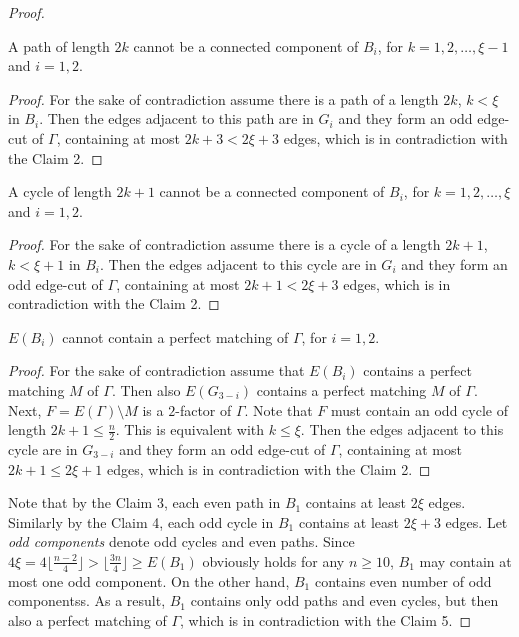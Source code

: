 \begin{proof}
    \begin{claim}
        A path of length $2k$ cannot be a connected component of $B_i$, for $k=1,2,\dots, \xi-1$ and $i = 1, 2$.
    \end{claim}
    \begin{proof}
        For the sake of contradiction assume there is a path of a length $2k$, $k<\xi$ in $B_i$. Then the edges adjacent to this path are in $G_i$ and they form an odd edge-cut of $\Gamma$, containing at most $2k+3<2\xi+3$ edges, which is in contradiction with the Claim 2.
    \end{proof}

    \begin{claim}
        A cycle of length $2k+1$ cannot be a connected component of $B_i$, for $k=1,2,\dots, \xi$ and $i = 1, 2$.
    \end{claim}
    \begin{proof}
        For the sake of contradiction assume there is a cycle of a length $2k+1$, $k<\xi+1$ in $B_i$. Then the edges adjacent to this cycle are in $G_i$ and they form an odd edge-cut of $\Gamma$, containing at most $2k+1<2\xi+3$ edges, which is in contradiction with the Claim 2.
    \end{proof}

    \begin{claim}
        $E(B_i)$ cannot contain a perfect matching of $\Gamma$, for $i = 1, 2$.
    \end{claim}
    \begin{proof}
        For the sake of contradiction assume that $E(B_i)$ contains a perfect matching $M$ of $\Gamma$. Then also $E(G_{3-i})$ contains a perfect matching $M$ of $\Gamma$. Next, $F=E(\Gamma)\setminus M$ is a $2$-factor of $\Gamma$. Note that $F$ must contain an odd cycle of length $2k+1\leq\frac n2$. This is equivalent with $k\leq\xi$. Then the edges adjacent to this cycle are in $G_{3-i}$ and they form an odd edge-cut of $\Gamma$, containing at most $2k+1\leq 2\xi+1$ edges, which is in contradiction with the Claim 2.
    \end{proof}

    Note that by the Claim 3, each even path in $B_1$ contains at least $2\xi$ edges. Similarly by the Claim 4, each odd cycle in $B_1$ contains at least $2\xi+3$ edges. Let \emph{odd components} denote odd cycles and even paths. Since $4\xi=4\lfloor\frac{n-2}{4}\rfloor>\lfloor\frac{3n}{4}\rfloor\geq E(B_1)$ obviously holds for any $n\geq 10$, $B_1$ may contain at most one odd component. On the other hand, $B_1$ contains even number of odd componentss. As a result, $B_1$ contains only odd paths and even cycles, but then also a perfect matching of $\Gamma$, which is in contradiction with the Claim 5.
\end{proof}
